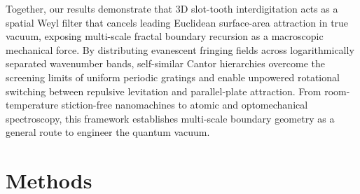 \documentclass[pdflatex,sn-nature]{sn-jnl}
\begin{document}
Together, our results demonstrate that 3D slot-tooth interdigitation acts as a spatial Weyl filter that cancels leading Euclidean surface-area attraction in true vacuum, exposing multi-scale fractal boundary recursion as a macroscopic mechanical force. By distributing evanescent fringing fields across logarithmically separated wavenumber bands, self-similar Cantor hierarchies overcome the screening limits of uniform periodic gratings and enable unpowered rotational switching between repulsive levitation and parallel-plate attraction. From room-temperature stiction-free nanomachines to atomic and optomechanical spectroscopy, this framework establishes multi-scale boundary geometry as a general route to engineer the quantum vacuum.

\section*{Methods}
\label{sec:methods}
\end{document}
